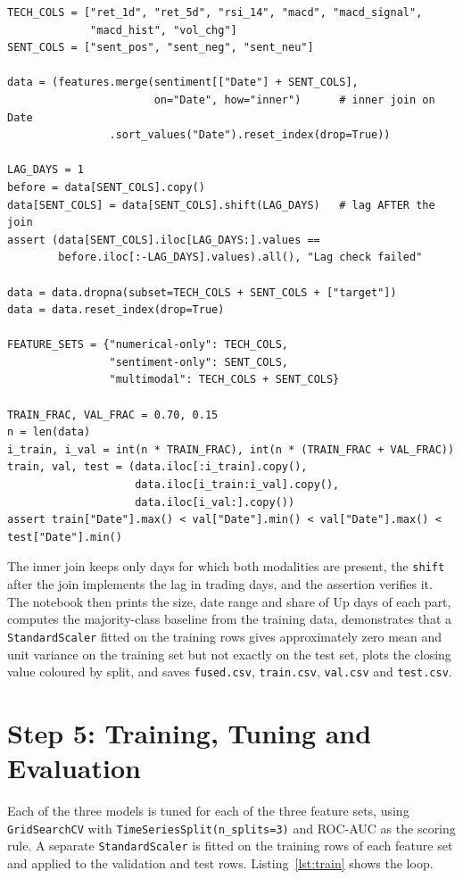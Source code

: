 \begin{lstlisting}[float=!htbp, caption={Alignment, lag and chronological split (Step 4).}, label={lst:fusion}]
TECH_COLS = ["ret_1d", "ret_5d", "rsi_14", "macd", "macd_signal",
             "macd_hist", "vol_chg"]
SENT_COLS = ["sent_pos", "sent_neg", "sent_neu"]

data = (features.merge(sentiment[["Date"] + SENT_COLS],
                       on="Date", how="inner")      # inner join on Date
                .sort_values("Date").reset_index(drop=True))

LAG_DAYS = 1
before = data[SENT_COLS].copy()
data[SENT_COLS] = data[SENT_COLS].shift(LAG_DAYS)   # lag AFTER the join
assert (data[SENT_COLS].iloc[LAG_DAYS:].values ==
        before.iloc[:-LAG_DAYS].values).all(), "Lag check failed"

data = data.dropna(subset=TECH_COLS + SENT_COLS + ["target"])
data = data.reset_index(drop=True)

FEATURE_SETS = {"numerical-only": TECH_COLS,
                "sentiment-only": SENT_COLS,
                "multimodal": TECH_COLS + SENT_COLS}

TRAIN_FRAC, VAL_FRAC = 0.70, 0.15
n = len(data)
i_train, i_val = int(n * TRAIN_FRAC), int(n * (TRAIN_FRAC + VAL_FRAC))
train, val, test = (data.iloc[:i_train].copy(),
                    data.iloc[i_train:i_val].copy(),
                    data.iloc[i_val:].copy())
assert train["Date"].max() < val["Date"].min() < val["Date"].max() < test["Date"].min()
\end{lstlisting}

The inner join keeps only days for which both modalities are present, the \texttt{shift} after the join implements the lag in trading days, and the assertion verifies it. The notebook then prints the size, date range and share of Up days of each part, computes the majority-class baseline from the training data, demonstrates that a \texttt{StandardScaler} fitted on the training rows gives approximately zero mean and unit variance on the training set but not exactly on the test set, plots the closing value coloured by split, and saves \texttt{fused.csv}, \texttt{train.csv}, \texttt{val.csv} and \texttt{test.csv}.

\section{Step 5: Training, Tuning and Evaluation}
Each of the three models is tuned for each of the three feature sets, using \texttt{GridSearchCV} with \texttt{TimeSeriesSplit(n\_splits=3)} and ROC-AUC as the scoring rule. A separate \texttt{StandardScaler} is fitted on the training rows of each feature set and applied to the validation and test rows. Listing~\ref{lst:train} shows the loop.


